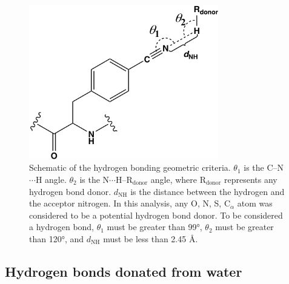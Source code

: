 \begin{figure}
    \center
    \includegraphics[width=3.25in]{figures-gfp-hbond/hbonding_scheme.png}
    \caption{Schematic of the hydrogen bonding geometric criteria. $\theta_1$ is the C--N$\cdots$H angle. $\theta_2$ is the N$\cdots$H--R$_{\text{donor}}$ angle, where R$_{\text{donor}}$ represents any hydrogen bond donor. $d_{\text{NH}}$ is the distance between the hydrogen and the acceptor nitrogen. In this analysis, any O, N, S, C$_{\alpha}$ atom was considered to be a potential hydrogen bond donor. To be considered a hydrogen bond, $\theta_1$ must be greater than \ang{99}, $\theta_2$ must be greater than \ang{120}, and $d_{\text{NH}}$ must be less than 2.45 \si{\angstrom}.}
    \label{fig:hbond-scheme}
\end{figure}

\subsection{Hydrogen bonds donated from water}


